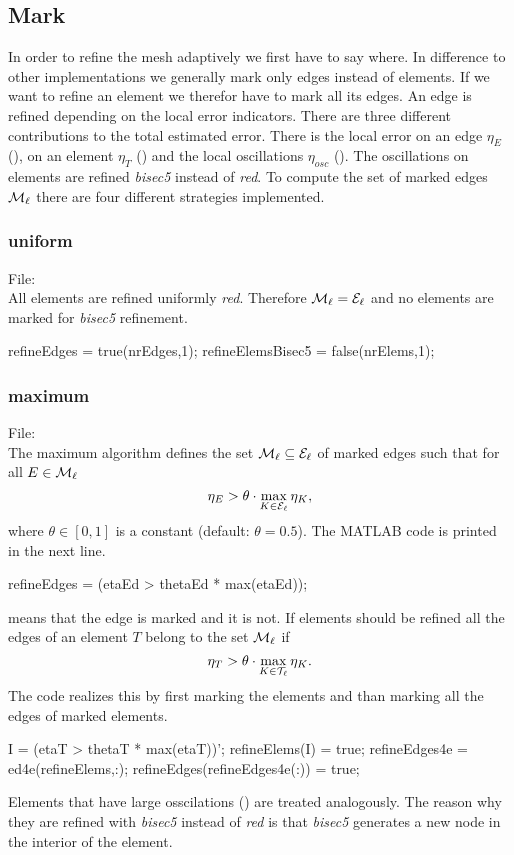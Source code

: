 \subsection{Mark}
In order to refine the mesh adaptively we first have to say where.
In difference to other implementations we generally mark only edges 
instead of elements. If we want to refine an element we therefor
have to mark all its edges.
An edge is refined depending on the local error indicators.
There are three different contributions to the total estimated error.
There is the local error on an edge $\eta_E$ (), on an element $\eta_T$ () and the 
local oscillations $\eta_{osc}$ (). The oscillations on elements are refined \emph{bisec5} instead of
\emph{red}. To compute the set of marked edges $\mathcal{M}_\ell$ there are four different
strategies implemented.
%
%
\subsubsection{uniform} $ $\\
File: \\[1.5ex]
All elements are refined uniformly \emph{red}. Therefore 
$\mathcal{M}_\ell = \mathcal{E}_\ell$ and no elements are marked for \emph{bisec5} refinement.
\begin{pcode}
refineEdges = true(nrEdges,1);
refineElemsBisec5 = false(nrElems,1);
\end{pcode}
%
\subsubsection{maximum} $ $\\
File: \\[1.5ex]
The maximum algorithm defines the set $\mathcal{M}_\ell\subseteq\mathcal{E}_\ell$ of marked edges such that for all $E\in\mathcal{M}_\ell$
\begin{equation*}
\eta_{E} >  \theta \cdot \max_{K\in\mathcal{E}_\ell}\eta_{K},
\end{equation*}
where $\theta \in [0,1]$ is a constant (default: $\theta = 0.5$).
The MATLAB code is printed in the next line.
\begin{pcode}
refineEdges = (etaEd > thetaEd * max(etaEd));
\end{pcode}
 means that the edge is marked and  it
is not.
If elements should be refined all the edges of an element $T$ belong to the set $\mathcal{M}_\ell$ if
\begin{equation*}
\eta_{T} >  \theta \cdot \max_{K\in\mathcal{T}_\ell}\eta_{K}.
\end{equation*}
The code realizes this by first marking the elements and than marking all the edges of marked elements.
\begin{pcode}
I = (etaT > thetaT * max(etaT))';
refineElems(I) = true;
refineEdges4e = ed4e(refineElems,:);
refineEdges(refineEdges4e(:)) = true;
\end{pcode}
Elements that have large osscilations
() are treated analogously. The reason why they are refined with \emph{bisec5}
instead of \emph{red} is that \emph{bisec5} generates
a new node in the interior of the element.\bigskip


